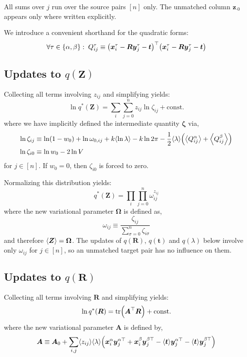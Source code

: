 \documentclass{article}
\newcommand{\lh}{\mathopen{}\mathclose\bgroup\left}
\newcommand{\rh}{\aftergroup\egroup\right}
\newcommand{\E}[1]{\lh\langle #1 \rh\rangle}
\newcommand{\m}[1]{\boldsymbol{#1}}
\newcommand{\const}{\mathrm{const.}}
\DeclareMathOperator{\trace}{tr}
\begin{document}
All sums over $j$ run over the source pairs $[n]$ only. The unmatched
column $\m{z}_{\cdot 0}$ appears only where written explicitly.

We introduce a convenient shorthand for the quadratic forms:
\begin{equation}
\forall \tau \in \{\alpha, \beta\}: \;
Q_{ij}^\tau \equiv
 \lh( \m{x}_i^\tau - \m{R} \m{y}_j^\tau - \m{t} \rh)^\top
 \lh( \m{x}_i^\tau - \m{R} \m{y}_j^\tau - \m{t} \rh)
\end{equation}

\subsection{Updates to $q(\m{Z})$}
Collecting all terms involving $z_{ij}$ and simplifying yields:
\begin{equation}
\ln q^*(\m{Z}) = \sum_i \sum_{j=0}^n z_{ij} \ln \zeta_{ij} + \const{}
\end{equation}
where we have implicitly defined the intermediate quantity $\m{\zeta}$ via,
\begin{equation}
\begin{aligned}
\ln \zeta_{ij} &\equiv
  \ln (1 - w_0)
  +\ln \omega_{0,ij}
  +k \E{\ln \lambda}
  -k \ln 2\pi
  -\frac{1}{2} \E{\lambda} \lh( \E{Q_{ij}^\alpha} + \E{Q_{ij}^\beta} \rh)
\\
\ln \zeta_{i0} &\equiv
  \ln w_0 - 2 \ln V
\end{aligned}
\end{equation}
for $j \in [n]$. If $w_0 = 0$, then $\zeta_{i0}$ is forced to zero.

Normalizing this distribution yields:
\begin{equation}
q^*(\m{Z}) = \prod_i \prod_{j=0}^n \omega_{ij}^{z_{ij}}
\end{equation}
where the new variational parameter $\m{\Omega}$ is defined as,
\begin{equation}
\omega_{ij} \equiv \frac{\zeta_{ij}}{\sum_{\sigma=0}^n \zeta_{i\sigma}}
\end{equation}
and therefore $\E{\m{Z}} = \m{\Omega}$. The updates of $q(\m{R})$,
$q(\m{t})$ and $q(\lambda)$ below involve only $\omega_{ij}$ for
$j \in [n]$, so an unmatched target pair has no influence on them.

\subsection{Updates to $q(\m{R})$}
Collecting all terms involving $\m{R}$ and simplifying yields:
\begin{equation}
\ln q^*(\m{R}) = \trace\lh( \m{A}^\top \m{R} \rh) + \const{}
\end{equation}
where the new variational parameter $\m{A}$ is defined by,
\begin{equation}
\m{A} \equiv
 \m{A}_0
 +\sum_{i,j} \E{z_{ij}} \E{\lambda} \lh(
     \m{x}_i^\alpha \m{y}_j^{\alpha\top}
    +\m{x}_i^\beta \m{y}_j^{\beta\top}
    -\E{\m{t}} \m{y}_j^{\alpha\top}
    -\E{\m{t}} \m{y}_j^{\beta\top}
 \rh)
\end{equation}
\end{document}
